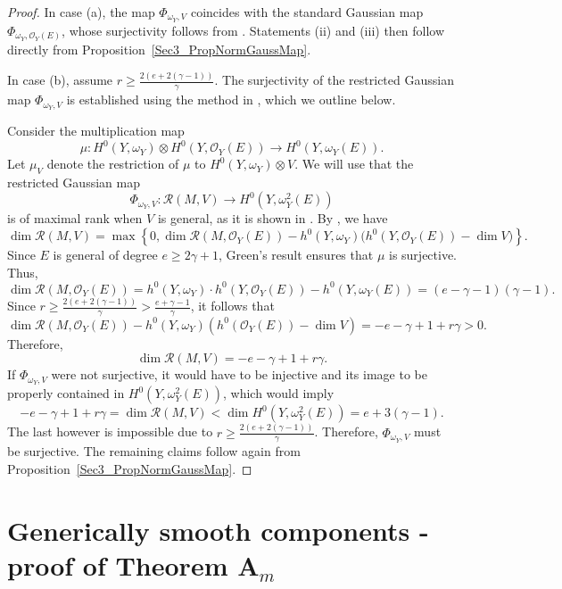 \documentclass[a4paper,12pt]{amsart}
\def\dim{\operatorname{dim}}
\begin{document}
\begin{proof}
In case \textnormal{(a)}, the map $\Phi_{\omega_Y, V}$ coincides with the standard Gaussian map $\Phi_{\omega_Y, \mathcal{O}_Y (E)}$, whose surjectivity follows from \cite[Proposition~(2.8)]{CLM96}. Statements \textnormal{(ii)} and \textnormal{(iii)} then follow directly from Proposition~\ref{Sec3_PropNormGaussMap}.

In case \textnormal{(b)}, assume $r \geq \frac{2(e + 2(\gamma-1))}{\gamma}$. The surjectivity of the restricted Gaussian map $\Phi_{\omega_Y, V}$ is established using the method in \cite[Proposition~7]{CIK21}, which we outline below.

Consider the multiplication map
\[
 \mu : H^0(Y, \omega_Y) \otimes H^0(Y, \mathcal{O}_Y(E)) \to H^0(Y, \omega_Y(E)).
\]
Let $\mu_V$ denote the restriction of $\mu$ to $H^0(Y, \omega_Y) \otimes V$.
We will use that the restricted Gaussian map
\[
 \Phi_{\omega_Y, V} : \mathscr{R}(M,V) \to H^0(Y, \omega_Y^2(E))
\]
is of maximal rank when $V$ is general, as it is shown in \cite{Bal1995}. By \cite[Proposition~4.3]{Bal1995}, we have
\[
 \dim \mathscr{R}(M,V) = \max\left\{0, \dim \mathscr{R}(M,\mathcal{O}_Y (E)) - h^0(Y, \omega_Y)\big(h^0(Y, \mathcal{O}_Y(E)) - \dim V\big)\right\}.
\]
Since $E$ is general of degree $e \geq 2\gamma + 1$, Green's result \cite{Green84} ensures that $\mu$ is surjective. Thus,
\[
 \dim \mathscr{R}(M,\mathcal{O}_Y (E)) = h^0(Y, \omega_Y)\cdot h^0(Y, \mathcal{O}_Y(E)) - h^0(Y, \omega_Y(E)) = (e - \gamma - 1)(\gamma - 1).
\]
Since $r \geq \frac{2(e + 2(\gamma-1))}{\gamma} > \frac{e + \gamma - 1}{\gamma}$, it follows that
\[
 \dim \mathscr{R}(M,\mathcal{O}_Y (E)) - h^0 (Y, \omega_Y) (h^0 (\mathcal{O}_Y (E)) - \dim V) = -e - \gamma + 1 + r \gamma > 0 .
\]
Therefore,
\[
 \dim \mathscr{R}(M,V) = -e - \gamma + 1 + r \gamma .
\]
If $\Phi_{\omega_Y, V}$ were not surjective, it would have to be injective and its image to be properly contained in $H^0 (Y, \omega^2_Y (E))$, which would imply
\[
 -e - \gamma + 1 + r \gamma = \dim \mathscr{R}(M,V) < \dim H^0 (Y, \omega^2_Y (E)) = e + 3(\gamma - 1) .
\]
The last however is impossible due to $r \geq \frac{2(e + 2(\gamma - 1))}{\gamma}$. Therefore, $\Phi_{\omega_Y, V}$ must be surjective. The remaining claims follow again from Proposition~\ref{Sec3_PropNormGaussMap}.
\end{proof}

\medskip



\section{Generically smooth components - proof of Theorem A\texorpdfstring{$_m$}{m}}\label{Sec4}
\end{document}
